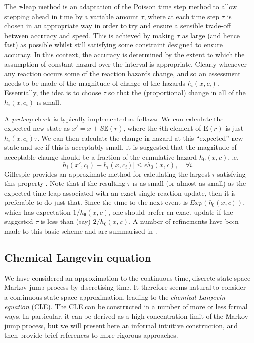 \documentclass[12pt, DIV12]{scrartcl}
\begin{document}
The $\tau$-leap method is an adaptation of the Poisson time step method to allow
stepping ahead in time by a variable amount $\tau$, where at each time step
$\tau$ is chosen in an appropriate way in order to try and ensure a sensible
trade-off between accuracy and speed. This is achieved by making $\tau$ as large
(and hence fast) as possible whilst still satisfying some constraint designed to
ensure accuracy. In this context, the accuracy is determined by the extent to
which the assumption of constant hazard over the interval is appropriate.
Clearly whenever any reaction occurs some of the reaction hazards change, and so
an assessment needs to be made of the magnitude of change of the hazards
$h_i(x,c_i)$. Essentially, the idea is to choose $\tau$ so that the
(proportional) change in all of the $h_i(x,c_i)$ is small.

A \emph{preleap} check is typically implemented as follows. We can calculate the
expected new state as $x'=x+S\text{E}(r)$, where the $i$th element of
$\text{E}(r)$ is just $h_i(x,c_i)\tau$. We can then calculate the change in
hazard at this ``expected'' new state and see if this is acceptably small. It is
suggested that the magnitude of acceptable change should be a fraction of the
cumulative hazard $h_0(x,c)$, ie.
\[
|h_i(x',c_i)-h_i(x,c_i)| \leq \epsilon h_0(x,c),\quad \forall i.
\]
Gillespie provides an approximate method for calculating the largest $\tau$
satisfying this property \citep{Gillespie01}. Note that if the resulting $\tau$
is as small (or almost as small) as the expected time leap associated with an
exact single reaction update, then it is preferable to do just that. Since the
time to the next event is $Exp(h_0(x,c))$, which has expectation $1/h_0(x,c)$,
one should prefer an exact update if the suggested $\tau$ is less than (say)
$2/h_0(x,c)$. A number of refinements have been made to this basic scheme and
are summarised in \cite{Sandmann2009}.


\subsection{Chemical Langevin equation}

We have considered an approximation to the continuous time, discrete state space
Markov jump process by discretising time. It therefore seems natural to consider
a continuous state space approximation, leading to the \emph{chemical Langevin
  equation} (CLE). The CLE can be constructed in a number of more or less formal
ways. In particular, it can be derived as a high concentration limit of the
Markov jump process, but we will present here an informal intuitive
construction, and then provide brief references to more rigorous approaches.
\end{document}
